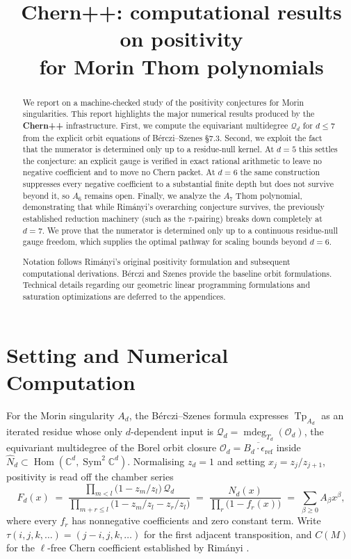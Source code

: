 \documentclass[11pt,a4paper]{article}
\title{\textbf{Chern++}: computational results on positivity\\[2pt]
       for Morin Thom polynomials}
\author{}
\date{}
\DeclareMathOperator{\Tp}{Tp}
\DeclareMathOperator{\mdeg}{mdeg}
\DeclareMathOperator{\Hom}{Hom}
\DeclareMathOperator{\Sym}{Sym}
\newcommand{\Qd}{\mathcal{Q}}
\newcommand{\Nhat}{\widehat{N}}
\newcommand{\eref}{\epsilon_{\mathrm{ref}}}
\theoremstyle{plain}
\theoremstyle{definition}
\theoremstyle{remark}
\begin{document}
\maketitle
\vspace{-2.4em}

\begin{abstract}
We report on a machine-checked study of the positivity conjectures for Morin
singularities. This report highlights the major numerical results produced by the \textbf{Chern++} infrastructure. First, we compute the equivariant multidegree $\Qd_d$ for $d \le 7$ from the explicit orbit equations of B\'erczi--Szenes \S7.3. 
Second, we exploit the fact that the numerator is determined only up to a residue-null kernel. At $d = 5$ this settles the conjecture: an explicit gauge is verified in exact rational arithmetic to leave no negative coefficient and to move no Chern packet. At $d = 6$ the same construction suppresses every negative coefficient to a substantial finite depth but does not survive beyond it, so $A_6$ remains open.
Finally, we analyze the $A_7$ Thom polynomial, demonstrating that while Rim\'anyi's overarching conjecture survives, the previously established reduction machinery (such as the $\tau$-pairing) breaks down completely at $d=7$. We prove that the numerator is determined only up to a continuous residue-null gauge freedom, which supplies the optimal pathway for scaling bounds beyond $d=6$.

Notation follows Rim\'anyi's original positivity formulation \cite{Rim01} and subsequent computational derivations. B\'erczi and Szenes \cite{BS12} provide the baseline orbit formulations. Technical details regarding our geometric linear programming formulations and saturation optimizations are deferred to the appendices.
\end{abstract}

\section{Setting and Numerical Computation}

For the Morin singularity $A_d$, the B\'erczi--Szenes formula expresses $\Tp_{A_d}$ as an
iterated residue whose only $d$-dependent input is $\Qd_d = \mdeg_{T_d}(\mathcal{O}_d)$, the
equivariant multidegree of the Borel orbit closure $\mathcal{O}_d = \overline{B_d \cdot \eref}$
inside $\Nhat_d \subset \Hom(\mathbb{C}^d, \Sym^2 \mathbb{C}^d)$. Normalising $z_d = 1$ and
setting $x_j = z_j/z_{j+1}$, positivity is read off the chamber series
\[
  F_d(x) \;=\;
  \frac{\prod_{m<l}\bigl(1 - z_m/z_l\bigr)\,\Qd_d}
       {\prod_{m+r\le l}\bigl(1 - z_m/z_l - z_r/z_l\bigr)}
  \;=\; \frac{N_d(x)}{\prod_{r}\bigl(1 - f_r(x)\bigr)}
  \;=\; \sum_{\beta \ge 0} A_\beta x^\beta ,
\]
where every $f_r$ has nonnegative coefficients and zero constant term. Write
$\tau(i,j,k,\dots) = (j-i,j,k,\dots)$ for the first adjacent transposition, and $C(M)$ for the
$\ell$-free Chern coefficient established by Rim\'anyi \cite{Rim01}.
\end{document}
